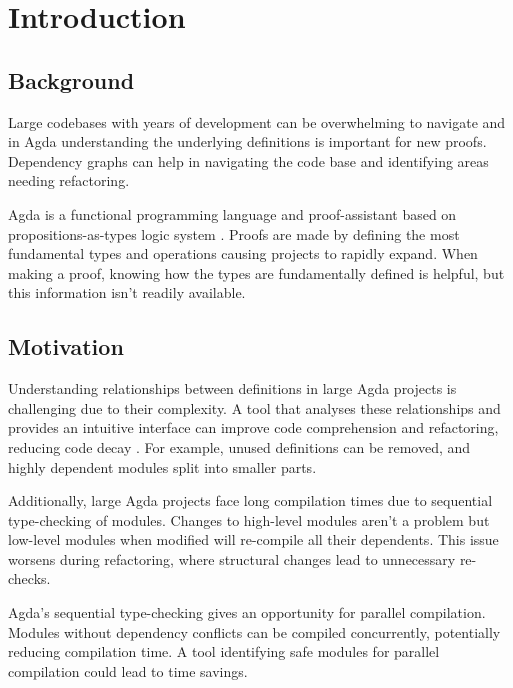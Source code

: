 
\chapter{Introduction}


\section{Background}

Large codebases with years of development can be overwhelming to navigate
\cite{code_decay} and in Agda understanding the underlying definitions is
important for new proofs. Dependency graphs can help in navigating the code
base and identifying areas needing refactoring\cite{dep_grah_refactoring}.

Agda is a functional programming language and proof-assistant based
on propositions-as-types logic system \cite{agda_docs}. Proofs are made by
defining the most fundamental types and operations causing projects to rapidly
expand. When making a proof, knowing how the types are fundamentally defined is
helpful, but this information isn't readily available.

\section{Motivation}


Understanding relationships between definitions in large Agda projects is
challenging due to their complexity. A tool that analyses these relationships
and provides an intuitive interface can improve code comprehension and
refactoring, reducing code decay \cite{fowler2018refactoring}. For example,
unused definitions can be removed, and highly dependent modules split into
smaller parts. 

Additionally, large Agda projects face long compilation times due to sequential
type-checking of modules. Changes to high-level modules aren't a problem but
low-level modules when modified will re-compile all their dependents. This
issue worsens during refactoring, where structural changes lead to unnecessary
re-checks. 

Agda's sequential type-checking gives an opportunity for parallel compilation.
Modules without dependency conflicts can be compiled concurrently, potentially
reducing compilation time. A tool identifying safe modules for parallel
compilation could lead to time savings.

